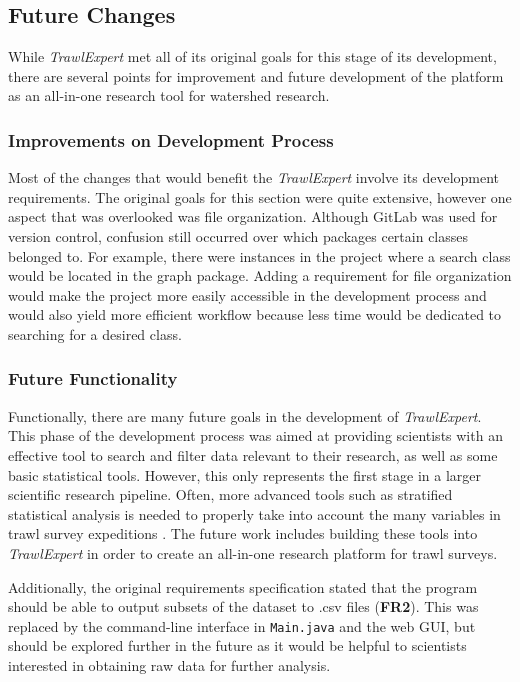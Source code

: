 \documentclass{article}
\begin{document}
\subsection{Future Changes}
While \textit{TrawlExpert} met all of its original goals for this stage of its development, there are several points for improvement and future development of the platform as an all-in-one research tool for watershed research.

\subsubsection{Improvements on Development Process}
Most of the changes that would benefit the \textit{TrawlExpert} involve its development requirements. The original goals for this section were quite extensive, however one aspect that was overlooked was file organization. Although GitLab was used for version control, confusion still occurred over which packages certain classes belonged to. For example, there were instances in the project where a search class would be located in the graph package. Adding a requirement for file organization would make the project more easily accessible in the development process and would also yield more efficient workflow because less time would be dedicated to searching for a desired class. 

\subsubsection{Future Functionality}
Functionally, there are many future goals in the development of \textit{TrawlExpert}. This phase of the development process was aimed at providing scientists with an effective tool to search and filter data relevant to their research, as well as some basic statistical tools. However, this only represents the first stage in a larger scientific research pipeline. Often, more advanced tools such as stratified statistical analysis is needed to properly take into account the many variables in trawl survey expeditions \citep{walsh1997efficiency}. The future work includes building these tools into \textit{TrawlExpert} in order to create an all-in-one research platform for trawl surveys.

Additionally, the original requirements specification stated that the program should be able to output subsets of the dataset to .csv files (\textbf{FR2}). This was replaced by the command-line interface in \texttt{Main.java} and the web GUI, but should be explored further in the future as it would be helpful to scientists interested in obtaining raw data for further analysis.

\clearpage


\end{document}
